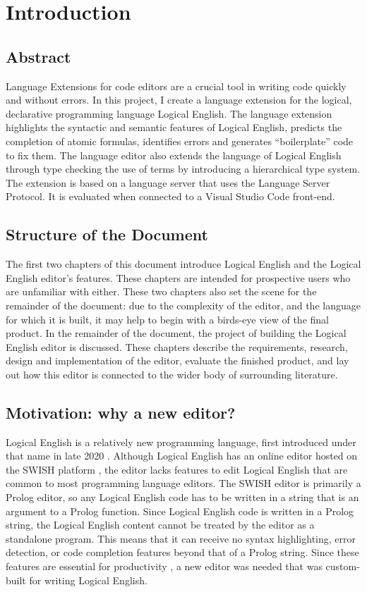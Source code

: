 \documentclass[../main.tex]{subfiles}
\begin{document}
\chapter{Introduction}
\section{Abstract}
Language Extensions for code editors are a crucial tool in writing code quickly and without errors. In this project, I create a language extension for the logical, declarative programming language Logical English. The language extension highlights the syntactic and semantic features of Logical English, predicts the completion of atomic formulas, identifies errors and generates ``boilerplate'' code to fix them. The language editor also extends the language of Logical English through type checking the use of terms by introducing a hierarchical type system. The extension is based on a language server that uses the Language Server Protocol. It is evaluated when connected to a Visual Studio Code front-end.

\section{Structure of the Document}
The first two chapters of this document introduce Logical English and the Logical English editor's features. These chapters are intended for prospective users who are unfamiliar with either. These two chapters also set the scene for the remainder of the document: due to the complexity of the editor, and the language for which it is built, it may help to begin with a birds-eye view of the final product. In the remainder of the document, the project of building the Logical English editor is discussed.  These chapters describe the requirements, research, design and implementation of the editor, evaluate the finished product, and lay out how this editor is connected to the wider body of surrounding literature.

\section{Motivation: why a new editor?}
Logical English is a relatively new programming language, first introduced under that name in late 2020 \cite{logical_english}. Although Logical English has an online editor hosted on the SWISH platform \cite{swish_editor}, the editor lacks features to edit Logical English that are common to most programming language editors. The SWISH editor is primarily a Prolog editor, so any Logical English code has to be written in a string that is an argument to a Prolog function. Since Logical English code is written in a Prolog string, the Logical English content cannot be treated by the editor as a standalone program. This means that it can receive no syntax highlighting, error detection, or code completion features beyond that of a Prolog string. Since these features are essential for productivity \cite{ide_productivity}, a new editor was needed that was custom-built for writing Logical English.
\end{document}
